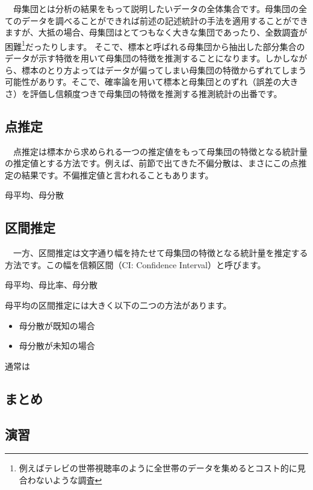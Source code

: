 \documentclass[
  12pt,
]{book}
\providecommand{\tightlist}{%
  \setlength{\itemsep}{0pt}\setlength{\parskip}{0pt}}
\begin{document}
　母集団とは分析の結果をもって説明したいデータの全体集合です。母集団の全てのデータを調べることができれば前述の記述統計の手法を適用することができますが、大抵の場合、母集団はとてつもなく大きな集団であったり、全数調査が困難\footnote{例えばテレビの世帯視聴率のように全世帯のデータを集めるとコスト的に見合わないような調査}だったりします。 そこで、標本と呼ばれる母集団から抽出した部分集合のデータが示す特徴を用いて母集団の特徴を推測することになります。しかしながら、標本のとり方よってはデータが偏ってしまい母集団の特徴からずれてしまう可能性がありす。そこで、確率論を用いて標本と母集団とのずれ（誤差の大きさ）を評価し信頼度つきで母集団の特徴を推測する推測統計の出番です。

\hypertarget{ux70b9ux63a8ux5b9a}{%
\subsection{点推定}\label{ux70b9ux63a8ux5b9a}}

　点推定は標本から求められる一つの推定値をもって母集団の特徴となる統計量の推定値とする方法です。例えば、前節で出てきた不偏分散は、まさにこの点推定の結果です。不偏推定値と言われることもあります。

母平均、母分散

\hypertarget{ux533aux9593ux63a8ux5b9a}{%
\subsection{区間推定}\label{ux533aux9593ux63a8ux5b9a}}

　一方、区間推定は文字通り幅を持たせて母集団の特徴となる統計量を推定する方法です。この幅を信頼区間（CI: Confidence Interval）と呼びます。

母平均、母比率、母分散

母平均の区間推定には大きく以下の二つの方法があります。

\begin{itemize}
\tightlist
\item
  母分散が既知の場合
\item
  母分散が未知の場合
\end{itemize}

通常は

\hypertarget{ux307eux3068ux3081-1}{%
\subsection{まとめ}\label{ux307eux3068ux3081-1}}

\hypertarget{ux6f14ux7fd2-4}{%
\subsection{演習}\label{ux6f14ux7fd2-4}}
\end{document}
